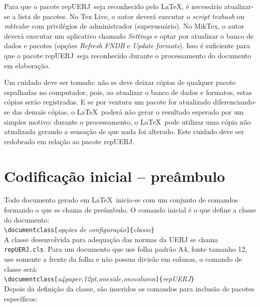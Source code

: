 \documentclass[a4paper,12pt,oneside,onecolumn]{article}
\newcommand{\comando}[1]{\texttt{\textbackslash #1}}
\newcommand{\opcoes}[1]{\texttt{[}\textsl{#1}\texttt{]}}
\newcommand{\param}[1]{\texttt{\{}\textsl{#1}\texttt{\}}}
\newcommand{\repUERJ}{\textsf{repUERJ}}
\begin{document}
Para que o pacote \repUERJ\ seja reconhecido pelo \LaTeX, é necessário atualizar-se a lista de pacotes. No Tex Live, o autor deverá executar o \textsl{script texhash} ou \textsl{mktexlsr} com privilégios de administrador (superusuário). No MikTex, o autor deverá executar um aplicativo chamado \textsl{Settings} e optar por atualizar o banco de dados e pacotes (opções \textsl{Refresh FNDB} e \textsl{Update formats}). Isso é suficiente para que o pacote \repUERJ\ seja reconhecido durante o processamento do documento em elaboração.

Um cuidado deve ser tomado: não se deve deixar cópias de qualquer pacote espalhadas no computador, pois, ao atualizar o banco de dados e formatos, estas cópias serão registradas. E se por ventura um pacote for atualizado diferenciando-se das demais cópias, o \LaTeX\ poderá não gerar o resultado esperado por um simples motivo: durante o processamento, o \LaTeX\ pode utilizar uma cópia não atualizada gerando a sensação de que nada foi alterado. Este cuidado deve ser redobrado em relação ao pacote \repUERJ.

\section{Codificação inicial -- preâmbulo}

Todo documento gerado em \LaTeX\ inicia-se com um conjunto de comandos formando o que se chama de preâmbulo. O comando inicial é o que define a classe do documento:\\

\comando{documentclass}\opcoes{opções de configuração}\param{classe}\\

A classe desenvolvida para adequação das normas da UERJ se chama \texttt{repUERJ.cls}. Para um documento que use folha padrão A4, fonte tamanho 12, use somente a frente da folha e não possua divisão em colunas, o comando de classe será:\\

\comando{documentclass}\opcoes{a4paper,12pt,oneside,onecolumn}\param{repUERJ}\\

Depois da definição da classe, são inseridos os comandos para inclusão de pacotes específicos:\\
\end{document}
